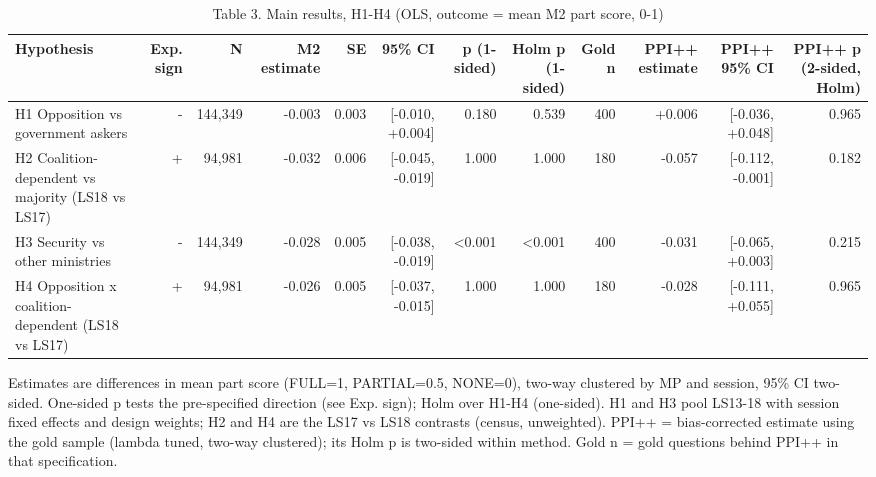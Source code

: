 \begin{table}[ht]
\centering
\small
\caption{Table 3. Main results, H1-H4 (OLS, outcome = mean M2 part score, 0-1)}
\begin{tabular}{lrrrrrrrrrrr}
\toprule
Hypothesis & Exp. sign & N & M2 estimate & SE & 95\% CI & p (1-sided) & Holm p (1-sided) & Gold n & PPI++ estimate & PPI++ 95\% CI & PPI++ p (2-sided, Holm) \\
\midrule
H1 Opposition vs government askers & - & 144,349 & -0.003 & 0.003 & {[}-0.010, +0.004] & 0.180 & 0.539 & 400 & +0.006 & {[}-0.036, +0.048] & 0.965 \\
H2 Coalition-dependent vs majority (LS18 vs LS17) & + & 94,981 & -0.032 & 0.006 & {[}-0.045, -0.019] & 1.000 & 1.000 & 180 & -0.057 & {[}-0.112, -0.001] & 0.182 \\
H3 Security vs other ministries & - & 144,349 & -0.028 & 0.005 & {[}-0.038, -0.019] & <0.001 & <0.001 & 400 & -0.031 & {[}-0.065, +0.003] & 0.215 \\
H4 Opposition x coalition-dependent (LS18 vs LS17) & + & 94,981 & -0.026 & 0.005 & {[}-0.037, -0.015] & 1.000 & 1.000 & 180 & -0.028 & {[}-0.111, +0.055] & 0.965 \\
\bottomrule
\end{tabular}
\par\footnotesize Estimates are differences in mean part score (FULL=1, PARTIAL=0.5, NONE=0), two-way clustered by MP and session, 95\% CI two-sided. One-sided p tests the pre-specified direction (see Exp. sign); Holm over H1-H4 (one-sided). H1 and H3 pool LS13-18 with session fixed effects and design weights; H2 and H4 are the LS17 vs LS18 contrasts (census, unweighted). PPI++ = bias-corrected estimate using the gold sample (lambda tuned, two-way clustered); its Holm p is two-sided within method. Gold n = gold questions behind PPI++ in that specification.
\end{table}
